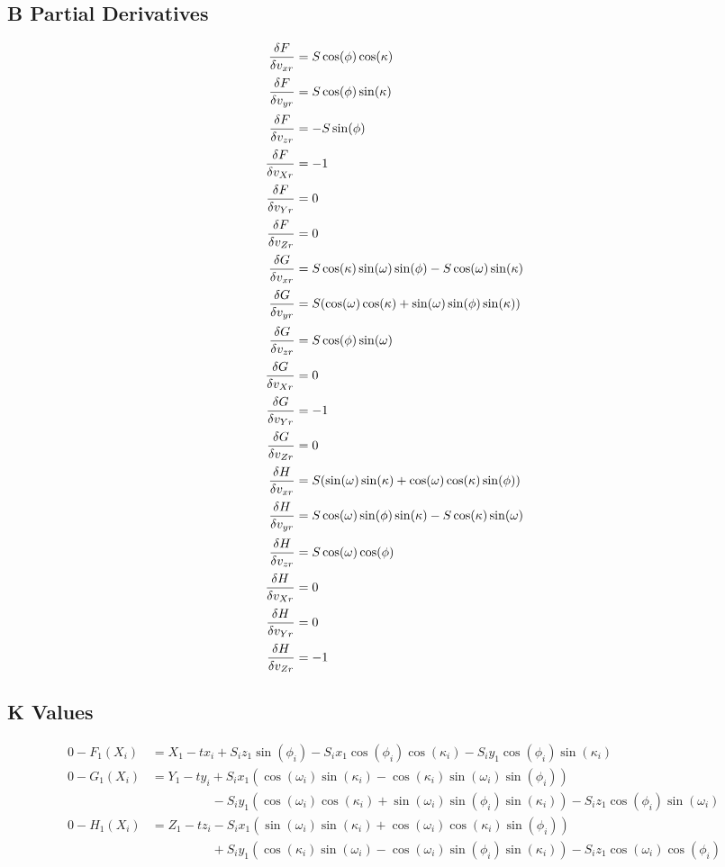 \subsection{B Partial Derivatives}
\begin{align*}
\frac{\delta F}{\delta v_{xr}} &= S\cos(\phi)\cos(\kappa) \\[0.4ex]
\frac{\delta F}{\delta v_{yr}} &= S\cos(\phi)\sin(\kappa) \\[0.4ex]
\frac{\delta F}{\delta v_{zr}} &= -S\sin(\phi) \\[0.4ex]
\frac{\delta F}{\delta v_{Xr}} &= -1 \\[0.4ex]
\frac{\delta F}{\delta v_{Yr}} &= 0 \\[0.4ex]
\frac{\delta F}{\delta v_{Zr}} &= 0 \\[0.4ex]
\frac{\delta G}{\delta v_{xr}} &= S\cos(\kappa)\sin(\omega)\sin(\phi) - S\cos(\omega)\sin(\kappa) \\[0.4ex]
\frac{\delta G}{\delta v_{yr}} &= S(\cos(\omega)\cos(\kappa) + \sin(\omega)\sin(\phi)\sin(\kappa)) \\[0.4ex]
\frac{\delta G}{\delta v_{zr}} &= S\cos(\phi)\sin(\omega) \\[0.4ex]
\frac{\delta G}{\delta v_{Xr}} &= 0 \\[0.4ex]
\frac{\delta G}{\delta v_{Yr}} &= -1 \\[0.4ex]
\frac{\delta G}{\delta v_{Zr}} &= 0 \\[0.4ex]
\frac{\delta H}{\delta v_{xr}} &= S(\sin(\omega)\sin(\kappa) + \cos(\omega)\cos(\kappa)\sin(\phi)) \\[0.4ex]
\frac{\delta H}{\delta v_{yr}} &= S\cos(\omega)\sin(\phi)\sin(\kappa) - S\cos(\kappa)\sin(\omega) \\[0.4ex]
\frac{\delta H}{\delta v_{zr}} &= S\cos(\omega)\cos(\phi) \\[0.4ex]
\frac{\delta H}{\delta v_{Xr}} &= 0 \\[0.4ex]
\frac{\delta H}{\delta v_{Yr}} &= 0 \\[0.4ex]
\frac{\delta H}{\delta v_{Zr}} &= -1 
\end{align*}
\subsection{K Values}
\begin{align*}
0-F_1(X_i) &= X_1 - tx_i + S_i z_1\sin(\phi_i) - S_i x_1 \cos(\phi_i)\cos(\kappa_i) - S_i y_1 \cos(\phi_i)\sin(\kappa_i) \\
0-G_1(X_i) &= Y_1 - ty_i + S_i x_1(\cos(\omega_i)\sin(\kappa_i) - \cos(\kappa_i)\sin(\omega_i)\sin(\phi_i))  \\
&\hspace{2cm} - S_i y_1 (\cos(\omega_i)\cos(\kappa_i) + \sin(\omega_i)\sin(\phi_i)\sin(\kappa_i)) - S_i z_1 \cos(\phi_i)\sin(\omega_i) \\
0-H_1(X_i) &= Z_1 - tz_i - S_i x_1(\sin(\omega_i)\sin(\kappa_i) + \cos(\omega_i)\cos(\kappa_i)\sin(\phi_i)) \\
&\hspace{2cm}+ S_i y_1 (\cos(\kappa_i)\sin(\omega_i) - \cos(\omega_i)\sin(\phi_i)\sin(\kappa_i)) - S_i z_1 \cos(\omega_i)\cos(\phi_i) \\
\end{align*}
\clearpage
